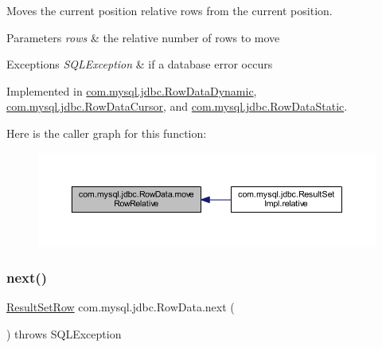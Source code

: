 Moves the current position relative \textquotesingle{}rows\textquotesingle{} from the current position.


\begin{DoxyParams}{Parameters}
{\em rows} & the relative number of rows to move \\
\hline
\end{DoxyParams}

\begin{DoxyExceptions}{Exceptions}
{\em S\+Q\+L\+Exception} & if a database error occurs \\
\hline
\end{DoxyExceptions}


Implemented in \mbox{\hyperlink{classcom_1_1mysql_1_1jdbc_1_1_row_data_dynamic_a4e4efbc17c848aff355ecbb68b2646ec}{com.\+mysql.\+jdbc.\+Row\+Data\+Dynamic}}, \mbox{\hyperlink{classcom_1_1mysql_1_1jdbc_1_1_row_data_cursor_a48c5fb5e19b57e073818cc524d913155}{com.\+mysql.\+jdbc.\+Row\+Data\+Cursor}}, and \mbox{\hyperlink{classcom_1_1mysql_1_1jdbc_1_1_row_data_static_ae1af87ce2daba5af9430ee3eaa5086ac}{com.\+mysql.\+jdbc.\+Row\+Data\+Static}}.

Here is the caller graph for this function\+:
\nopagebreak
\begin{figure}[H]
\begin{center}
\leavevmode
\includegraphics[width=350pt]{interfacecom_1_1mysql_1_1jdbc_1_1_row_data_ad0ef1f79fa19fbd533c4e1bfbabd7316_icgraph}
\end{center}
\end{figure}
\mbox{\label{interfacecom_1_1mysql_1_1jdbc_1_1_row_data_a1984eb77a7be765f3da79a1e2349af59}} 
\subsubsection{\texorpdfstring{next()}{next()}}
{\footnotesize\ttfamily \mbox{\hyperlink{classcom_1_1mysql_1_1jdbc_1_1_result_set_row}{Result\+Set\+Row}} com.\+mysql.\+jdbc.\+Row\+Data.\+next (\begin{DoxyParamCaption}{ }\end{DoxyParamCaption}) throws S\+Q\+L\+Exception}

